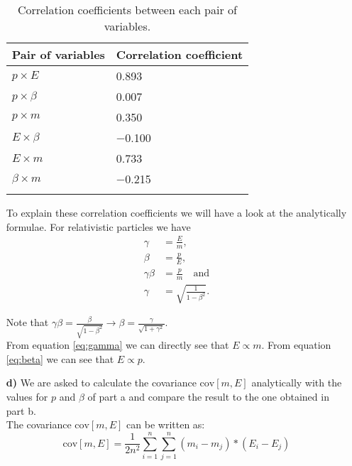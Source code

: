 \documentclass[10pt]{article}
\newenvironment{myfont}{\fontfamily{put}\selectfont}{\par}
\begin{document}
\begin{myfont}
\begin{itemize}
    \begin{longtable}{*{2}l}
      \caption[]{Correlation coefficients between each pair of variables. \\ }
      \endfirsthead
      \endhead
      \toprule
      \textbf{Pair of variables} & \textbf{Correlation coefficient} \\
      \midrule
      $p \times E$     & \num{0.893} \\
      $p \times \beta$ & \num{0.007} \\
      $p \times m$     & \num{0.350} \\
      $E \times \beta$ & \num{-0.100} \\
      $E \times m$     & \num{0.733} \\
      $\beta \times m$ & \num{-0.215} \\
      \bottomrule
      \label{tab:ex_c_coefficients}
    \end{longtable}

    \noindent To explain these correlation coefficients we will have a look at the analytically formulae.
    For relativistic particles we have
    \begin{align}
      \gamma      & = \frac{E}{m}, \label{eq:gamma}\\
      \beta       & = \frac{p}{E}, \label{eq:beta}\\
      \gamma\beta & = \frac{p}{m} \quad \textrm{and} \label{eq:gammabeta}\\
      \gamma      & = \sqrt{\frac{1}{1 - \beta^{2}}}. \label{eq:gamma2}
    \end{align}

    \noindent Note that $\gamma\beta = \frac{\beta}{\sqrt{1-\beta^{2}}} \rightarrow \beta = \frac{\gamma}{\sqrt{1 + \gamma^{2}}}$. \\

    \noindent From equation \ref{eq:gamma} we can directly see that $E \propto m$.
    From equation \ref{eq:beta} we can see that $E \propto p$.

  \item[\textbf{d)}] \label{part_d}
    We are asked to calculate the covariance $\textrm{cov}[m, E]$ analytically with the values for $p$ and $\beta$ of part a and compare the result to the one obtained in part b.\\
   The covariance $\textrm{cov}[m, E]$ can be written as:
   \begin{equation}
   \textrm{cov}[m, E] = \frac{1}{2n^2} \sum_{i=1}^n \sum_{j=1}^n (m_i - m_j)* (E_i - E_j)
   \end{equation}


\end{itemize}
\end{myfont}
\end{document}
